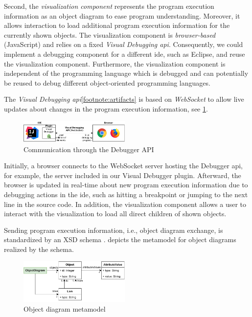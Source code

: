 \documentclass[conference]{IEEEtran}
\begin{document}
Second, the \textit{visualization component} represents the program execution information as an object diagram to ease program understanding.
Moreover, it allows interaction to load additional program execution information for the currently shown objects.
The visualization component is \emph{browser-based} (JavaScript) and relies on a fixed \emph{Visual Debugging \gls*{api}}.
Consequently, we could implement a debugging component for a different \gls*{ide}, such as Eclipse, and reuse the visualization component.
Furthermore, the visualization component is independent of the programming language which is debugged and can potentially be reused to debug different object-oriented programming languages.

The \textit{Visual Debugging \gls*{api}}\cref{footnote:artifacts} is based on \emph{WebSocket} to allow live updates about changes in the program execution information, see \cref{fig:api}.

\begin{figure}[h]
    \centering
    \includegraphics[width=0.488\textwidth]{images/VD-architecture.pdf}
    \caption{Communication through the Debugger API}
    \label{fig:api}
\end{figure}

Initially, a browser connects to the WebSocket server hosting the Debugger \gls*{api}, for example, the server included in our Visual Debugger plugin.
Afterward, the browser is updated in real-time about new program execution information due to debugging actions in the \gls*{ide}, such as hitting a breakpoint or jumping to the next line in the source code.
In addition, the visualization component allows a user to interact with the visualization to load all direct children of shown objects.

Sending program execution information, i.e., object diagram exchange, is standardized by an XSD schema \cite{ArtifactsICSME2022}.
 depicts the metamodel for object diagrams realized by the schema.

\begin{figure}[h]
    \centering
    \includegraphics[width=0.488\textwidth]{images/VD-metamodel.pdf}
    \caption{Object diagram metamodel}
    \label{fig:odMetamodel}
\end{figure}
\end{document}
